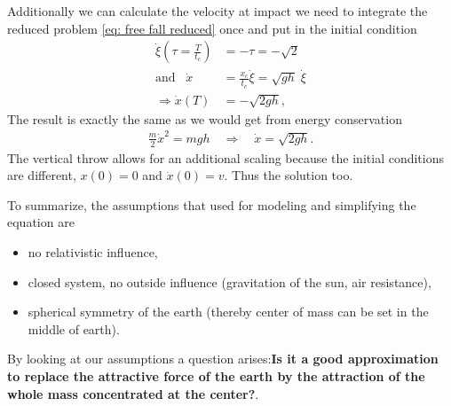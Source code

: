 Additionally we can calculate the velocity at impact we need to integrate the
reduced problem \ref{eq: free fall reduced} once and put in the initial
condition
\begin{align}
    \dot{\xi}(\tau = \frac{T}{t_c}) &= -\tau = -\sqrt{2} \\
    \text{and} \;\;\; \dot{x} &= \frac{x_c}{t_c}\dot{\xi} =
    \sqrt{gh}\; \dot{\xi}\\
    \Rightarrow \dot{x}(T) &= -\sqrt{2gh},
\end{align}
The result is exactly the same as we would get from energy conservation
\begin{align}
    \frac{m}{2}\dot{x}^2 = mgh \quad \Rightarrow \quad \dot{x} = \sqrt{2gh}.
\end{align}
The vertical throw allows for an additional scaling because the
initial conditions are different, $x(0) = 0$ and $\dot{x}(0) = v$. Thus
the solution too.

To summarize, the assumptions that used for modeling and simplifying the
equation are
\begin{itemize}
    \item no relativistic influence,
    \item closed system, no outside influence (gravitation of the sun, air
        resistance),
    \item spherical symmetry of the earth (thereby center of mass can be
        set in the middle of earth).
\end{itemize}
By looking at our assumptions a question arises:\textbf{Is it a good
approximation to replace the attractive force of the earth by the attraction
of the whole mass concentrated at the center?}.

